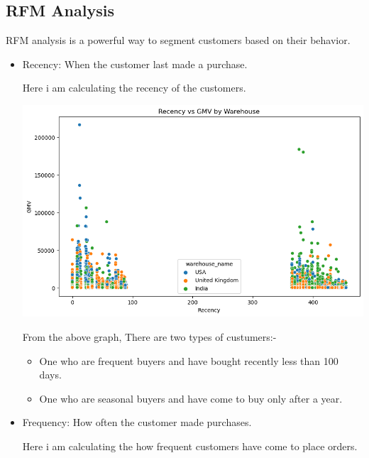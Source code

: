 \documentclass{article}
\begin{document}
    \subsection{RFM Analysis}
    RFM analysis is a powerful way to segment customers based on their behavior.\\
\begin{itemize}
    \item Recency: When the customer last made a purchase.{
        Here i am calculating the recency of the customers.\\
        \begin{center}
            \includegraphics[width=1\columnwidth]{images/recency.png}
        \end{center}
        \begin{tcolorbox}[colback=lightPink!5!white,colframe=lightPink!75!black,title=Insights]
            From the above graph, There are two types of custumers:-
            \begin{itemize}
                \item One who are frequent buyers and have bought recently less than 100 days.
                \item One who are seasonal buyers and have come to buy only after a year.
            \end{itemize}
        \end{tcolorbox}
    }
    \item Frequency: How often the customer made purchases.{
        Here i am calculating the how frequent customers have come to place orders.\\
        \begin{center}

\end{center}}
\end{itemize}
\end{document}

